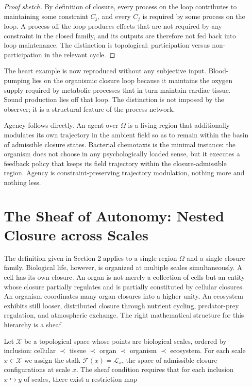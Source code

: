 \documentclass[11pt, a4paper]{article}
\theoremstyle{plain}
\theoremstyle{definition}
\theoremstyle{remark}
\newcommand{\CL}{\mathcal{L}}
\begin{document}
\begin{proof}[Proof sketch]
By definition of closure, every process on the loop contributes to maintaining some constraint $C_j$, and every $C_j$ is required by some process on the loop. A process off the loop produces effects that are not required by any constraint in the closed family, and its outputs are therefore not fed back into loop maintenance. The distinction is topological: participation versus non-participation in the relevant cycle.
\end{proof}

The heart example is now reproduced without any subjective input. Blood-pumping lies on the organismic closure loop because it maintains the oxygen supply required by metabolic processes that in turn maintain cardiac tissue. Sound production lies off that loop. The distinction is not imposed by the observer; it is a structural feature of the process network.

Agency follows directly. An agent over $\Omega$ is a living region that additionally modulates its own trajectory in the ambient field so as to remain within the basin of admissible closure states. Bacterial chemotaxis is the minimal instance: the organism does not choose in any psychologically loaded sense, but it executes a feedback policy that keeps its field trajectory within the closure-admissible region. Agency is constraint-preserving trajectory modulation, nothing more and nothing less.

\section{The Sheaf of Autonomy: Nested Closure across Scales}

The definition given in Section 2 applies to a single region $\Omega$ and a single closure family. Biological life, however, is organized at multiple scales simultaneously. A cell has its own closure. An organ is not merely a collection of cells but an entity whose closure partially regulates and is partially constituted by cellular closures. An organism coordinates many organ closures into a higher unity. An ecosystem exhibits still looser, distributed closure through nutrient cycling, predator-prey regulation, and atmospheric exchange. The right mathematical structure for this hierarchy is a sheaf.

Let $\mathcal{X}$ be a topological space whose points are biological scales, ordered by inclusion: cellular $\prec$ tissue $\prec$ organ $\prec$ organism $\prec$ ecosystem. For each scale $x \in \mathcal{X}$ we assign the stalk $\mathcal{F}(x) = \CL_x$, the space of admissible closure configurations at scale $x$. The sheaf condition requires that for each inclusion $x \hookrightarrow y$ of scales, there exist a restriction map
\end{document}
